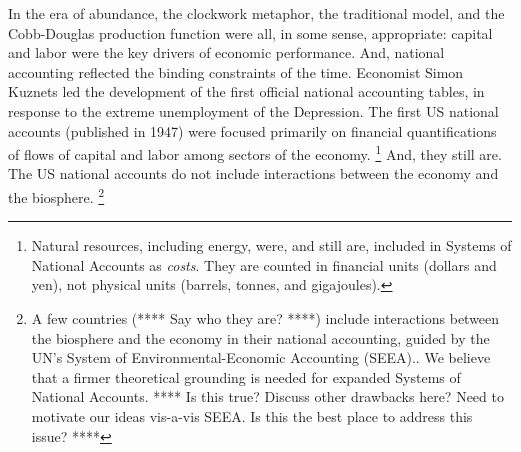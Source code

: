 In the era of abundance, 
the clockwork metaphor, 
the traditional model, 
and the Cobb-Douglas production function 
were all, in some sense, appropriate: 
capital and labor were the key drivers of economic performance.
And, national accounting reflected the binding constraints of the time. 
Economist Simon Kuznets led the development
of the first official national accounting tables,
in response to the extreme unemployment of the Depression. 
The first US national accounts (published in 1947) 
were focused primarily on financial quantifications 
of flows of capital and labor
among sectors of the economy.%
	\footnote{
	Natural resources, including energy, were, and still are, 
	included in Systems of National Accounts as \emph{costs}.
	They are counted in financial units
	(dollars and yen), 
	not physical units
	(barrels, tonnes, and gigajoules).
	}
And, they still are. 
The US national accounts do not include 
interactions between the economy and the biosphere.%
	\footnote{
	A few countries (**** Say who they are? ****) 
	include interactions 
	between the biosphere and the economy in their national accounting,
	guided by the UN's System of Environmental-Economic Accounting 
	(SEEA).\cite[p. 1]{UNSEEA2014}.
	We believe that a firmer theoretical grounding
	is needed for expanded Systems of National Accounts.
	**** Is this true? Discuss other drawbacks here?
	Need to motivate our ideas vis-a-vis SEEA.
	Is this the best place to address this issue? ****
	}

